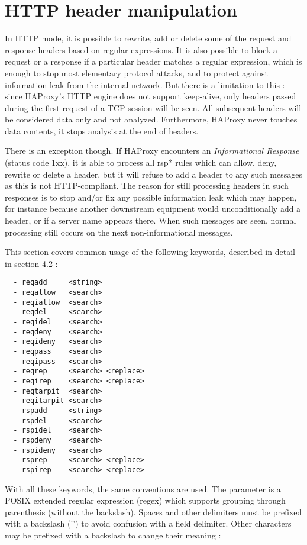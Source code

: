 
\chapter{HTTP header manipulation}

In HTTP mode, it is possible to rewrite, add or delete some of the request and
response headers based on regular expressions. It is also possible to block a
request or a response if a particular header matches a regular expression,
which is enough to stop most elementary protocol attacks, and to protect
against information leak from the internal network. But there is a limitation
to this : since HAProxy's HTTP engine does not support keep-alive, only headers
passed during the first request of a TCP session will be seen. All subsequent
headers will be considered data only and not analyzed. Furthermore, HAProxy
never touches data contents, it stops analysis at the end of headers.


There is an exception though. If HAProxy encounters an \emph{Informational Response}
(status code 1xx), it is able to process all rsp* rules which can allow, deny,
rewrite or delete a header, but it will refuse to add a header to any such
messages as this is not HTTP-compliant. The reason for still processing headers
in such responses is to stop and/or fix any possible information leak which may
happen, for instance because another downstream equipment would unconditionally
add a header, or if a server name appears there. When such messages are seen,
normal processing still occurs on the next non-informational messages.


This section covers common usage of the following keywords, described in detail
in section 4.2 :

\begin{verbatim}
  - reqadd     <string>
  - reqallow   <search>
  - reqiallow  <search>
  - reqdel     <search>
  - reqidel    <search>
  - reqdeny    <search>
  - reqideny   <search>
  - reqpass    <search>
  - reqipass   <search>
  - reqrep     <search> <replace>
  - reqirep    <search> <replace>
  - reqtarpit  <search>
  - reqitarpit <search>
  - rspadd     <string>
  - rspdel     <search>
  - rspidel    <search>
  - rspdeny    <search>
  - rspideny   <search>
  - rsprep     <search> <replace>
  - rspirep    <search> <replace>
\end{verbatim}


With all these keywords, the same conventions are used. The  parameter
is a POSIX extended regular expression (regex) which supports grouping through
parenthesis (without the backslash). Spaces and other delimiters must be
prefixed with a backslash ('\bslash ') to avoid confusion with a field delimiter.
Other characters may be prefixed with a backslash to change their meaning :

